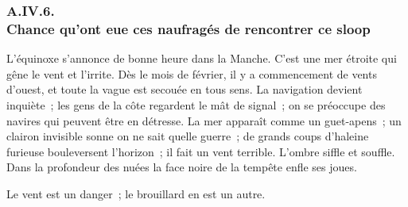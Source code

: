 \documentclass[french,twoside]{book} %
\begin{document}
 \subsubsection[{A.IV.6. Chance qu’ont eue ces naufragés de rencontrer ce sloop}]{A.IV.6. \\
Chance qu’ont eue ces naufragés de rencontrer ce sloop}
\noindent L’équinoxe s’annonce de bonne heure dans la Manche. C’est une mer étroite qui gêne le vent et l’irrite. Dès le mois de février, il y a commencement de vents d’ouest, et toute la vague est secouée en tous sens. La navigation devient inquiète ; les gens de la côte regardent le mât de signal ; on se préoccupe des navires qui peuvent être en détresse. La mer apparaît comme un guet-apens ; un clairon invisible sonne on ne sait quelle guerre ; de grands coups d’haleine furieuse bouleversent l’horizon ; il fait un vent terrible. L’ombre siffle et souffle. Dans la profondeur des nuées la face noire de la tempête enfle ses joues.\par
Le vent est un danger ; le brouillard en est un autre.\par
\end{document}
